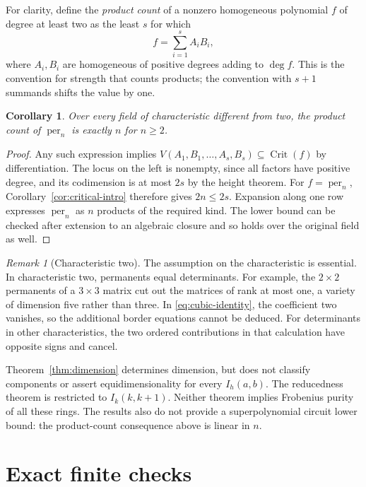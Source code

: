 \documentclass[11pt]{article}
\newtheorem{corollary}[theorem]{Corollary}
\theoremstyle{remark}
\newtheorem{remark}[theorem]{Remark}
\DeclareMathOperator{\per}{per}
\DeclareMathOperator{\Crit}{Crit}
\numberwithin{equation}{section}
\begin{document}
For clarity, define the \emph{product count} of a nonzero homogeneous
polynomial $f$ of degree at least two as the least $s$ for which
\[
 f=\sum_{i=1}^s A_iB_i,
\]
where $A_i,B_i$ are homogeneous of positive degrees adding to
$\deg f$. This is the convention for strength that counts products;
the convention with $s+1$ summands shifts the value by one.

\begin{corollary}\label{cor:strength}
Over every field of characteristic different from two, the product
count of $\per_n$ is exactly $n$ for $n\geq2$.
\end{corollary}

\begin{proof}
Any such expression implies
$V(A_1,B_1,\ldots,A_s,B_s)\subseteq\Crit(f)$ by differentiation.
The locus on the left is nonempty, since all factors have positive
degree, and its codimension is at most $2s$ by the height theorem.
For $f=\per_n$, Corollary~\ref{cor:critical-intro} therefore gives
$2n\leq2s$. Expansion along one row expresses $\per_n$ as $n$
products of the required kind. The lower bound can be checked after
extension to an algebraic closure and so holds over the original
field as well.
\end{proof}

\begin{remark}[Characteristic two]
The assumption on the characteristic is essential. In characteristic
two, permanents equal determinants. For example, the $2\times2$
permanents of a $3\times3$ matrix cut out the matrices of rank at
most one, a variety of dimension five rather than three.
In \eqref{eq:cubic-identity}, the coefficient two vanishes, so the
additional border equations cannot be deduced. For determinants in
other characteristics, the two ordered contributions in that
calculation have opposite signs and cancel.
\end{remark}

Theorem~\ref{thm:dimension} determines dimension, but does not
classify components or assert equidimensionality for every
$I_h(a,b)$. The reducedness theorem is restricted to
$I_k(k,k+1)$. Neither theorem implies Frobenius purity of all these
rings. The results also do not provide a superpolynomial circuit
lower bound: the product-count consequence above is linear in $n$.

\appendix
\section{Exact finite checks}\label{app:checks}
\end{document}
